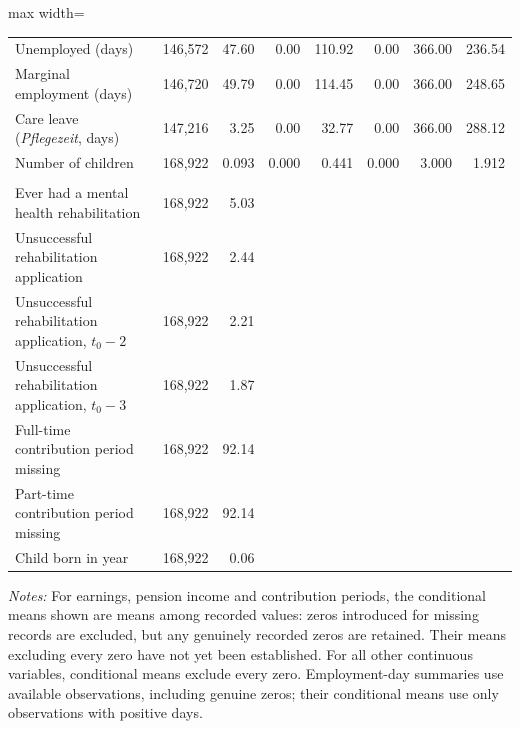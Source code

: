 \documentclass[a4paper,12pt]{article}
\theoremstyle{plain}
\theoremstyle{definition}
\theoremstyle{TheoremNum}
\theoremstyle{CorollaryNum}
\theoremstyle{PropositionNum}
\theoremstyle{TheoremNum}
\begin{document}
\begin{table}[H]
\begin{adjustbox}{max width=\textwidth}
\begin{tabular}{lrrrrrrr}
Unemployed (days)
& 146,572 & 47.60 & 0.00 & 110.92 & 0.00 & 366.00 & 236.54 \\
Marginal employment (days)
& 146,720 & 49.79 & 0.00 & 114.45 & 0.00 & 366.00 & 248.65 \\
Care leave (\textit{Pflegezeit}, days)
& 147,216 & 3.25 & 0.00 & 32.77 & 0.00 & 366.00 & 288.12 \\
Number of children
& 168,922 & 0.093 & 0.000 & 0.441 & 0.000 & 3.000 & 1.912 \\
\addlinespace
\hline
\multicolumn{8}{l}{Panel B: Binary variables (\% with the characteristic)} \\ \hline
Ever had a mental health rehabilitation
& 168,922 & 5.03 & & & & & \\
Unsuccessful rehabilitation application
& 168,922 & 2.44 & & & & & \\
Unsuccessful rehabilitation application, $t_0-2$
& 168,922 & 2.21 & & & & & \\
Unsuccessful rehabilitation application, $t_0-3$
& 168,922 & 1.87 & & & & & \\
Full-time contribution period missing
& 168,922 & 92.14 & & & & & \\
Part-time contribution period missing
& 168,922 & 92.14 & & & & & \\
Child born in year
& 168,922 & 0.06 & & & & & \\
\bottomrule
\end{tabular}
\end{adjustbox}

\par\smallskip
\begin{minipage}{\textwidth}
\footnotesize
\textit{Notes:} For earnings, pension income and contribution periods, the conditional means shown are means among recorded values: zeros introduced for missing records are excluded, but any genuinely recorded zeros are retained. Their means excluding every zero have not yet been established. For all other continuous variables, conditional means exclude every zero. Employment-day summaries use available observations, including genuine zeros; their conditional means use only observations with positive days.
\end{minipage}
\end{table}
\end{document}
